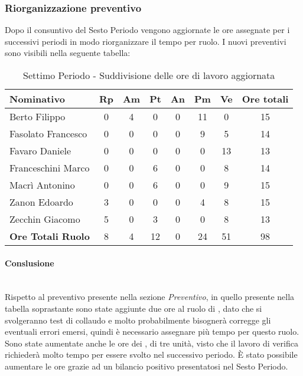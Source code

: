 \documentclass[../PianoDiProgetto_v4.0.0.tex]{subfiles}
\begin{document}
		\subsubsection{Riorganizzazione preventivo}
		Dopo il consuntivo del Sesto Periodo vengono aggiornate le ore assegnate per i successivi periodi in modo riorganizzare il tempo per ruolo. I nuovi preventivi sono visibili nella seguente tabella:
		
		\begin{table}[h]
			\begin{tabularx}{\textwidth}{l * {6}{C} c}
			\toprule
			\textbf{Nominativo} & \textbf{Rp} & \textbf{Am} & \textbf{Pt} & \textbf{An} & \textbf{Pm} & \textbf{Ve} & \textbf{Ore totali} \\
			\midrule
			Berto Filippo &	0 & 4 & 0 & 0 & 11 & 0 & 15 \\
			Fasolato Francesco & 0 & 0 & 0 & 0 & 9 & 5 & 14 \\
			Favaro Daniele & 0 & 0 & 0 & 0 & 0 & 13 & 13 \\
			Franceschini Marco & 0 & 0 & 6 & 0 & 0 & 8 & 14 \\
			Macrì Antonino & 0 & 0 & 6 & 0 & 0 & 9 & 15 \\
			Zanon Edoardo &	3 & 0 & 0 & 0 & 4 & 8 & 15 \\
			Zecchin Giacomo & 5 & 0 & 3 & 0 & 0 & 8 & 13 \\
			\midrule		
			\textbf{Ore Totali Ruolo} & 8 & 4 & 12 & 0 & 24 & 51 & 98 \\
			\bottomrule
			\end{tabularx}
			\caption{Settimo Periodo - Suddivisione delle ore di lavoro aggiornata}		
		\end{table}
		
		\paragraph{Conslusione} \mbox{} \\
		Rispetto al preventivo presente nella sezione \textit{Preventivo}, in quello presente nella tabella soprastante sono state aggiunte due ore al ruolo di \programmatore, dato che si svolgeranno test di collaudo e molto probabilmente bisognerà corregge gli eventuali errori emersi, quindi è necessario assegnare più tempo per questo ruolo. Sono state aumentate anche le ore dei \verificatori, di tre unità, visto che il lavoro di verifica richiederà molto tempo per essere svolto nel successivo periodo. È stato possibile aumentare le ore grazie ad un bilancio positivo presentatosi nel Sesto Periodo.
		
\end{document}

